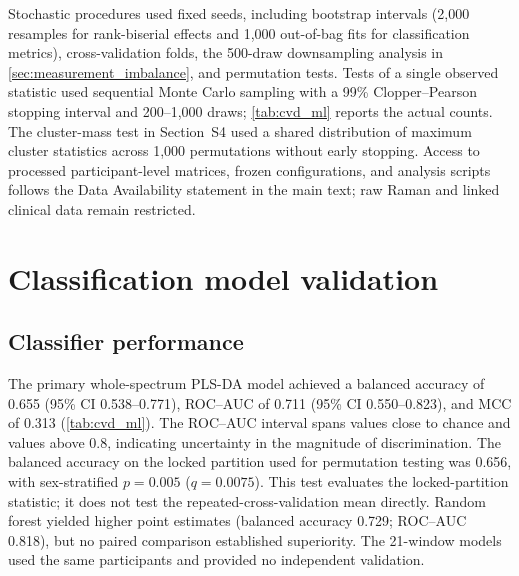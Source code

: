 \documentclass[preprint,12pt]{elsarticle}
\begin{document}
Stochastic procedures used fixed seeds, including bootstrap intervals (2,000 resamples for rank-biserial effects and 1,000 out-of-bag fits for classification metrics), cross-validation folds, the 500-draw downsampling analysis in \cref{sec:measurement_imbalance}, and permutation tests. Tests of a single observed statistic used sequential Monte Carlo sampling \cite{besag1991} with a 99\% Clopper--Pearson stopping interval and 200--1,000 draws; \cref{tab:cvd_ml} reports the actual counts. The cluster-mass test in Section~S4 used a shared distribution of maximum cluster statistics across 1,000 permutations without early stopping. Access to processed participant-level matrices, frozen configurations, and analysis scripts follows the Data Availability statement in the main text; raw Raman and linked clinical data remain restricted.


\section{Classification model validation}
\subsection{Classifier performance}

The primary whole-spectrum PLS-DA model achieved a balanced accuracy of 0.655 (95\% CI 0.538--0.771), ROC--AUC of 0.711 (95\% CI 0.550--0.823), and MCC of 0.313 (\cref{tab:cvd_ml}). The ROC--AUC interval spans values close to chance and values above 0.8, indicating uncertainty in the magnitude of discrimination. The balanced accuracy on the locked partition used for permutation testing was 0.656, with sex-stratified $p=0.005$ ($q=0.0075$). This test evaluates the locked-partition statistic; it does not test the repeated-cross-validation mean directly. Random forest yielded higher point estimates (balanced accuracy 0.729; ROC--AUC 0.818), but no paired comparison established superiority. The 21-window models used the same participants and provided no independent validation.
\end{document}

